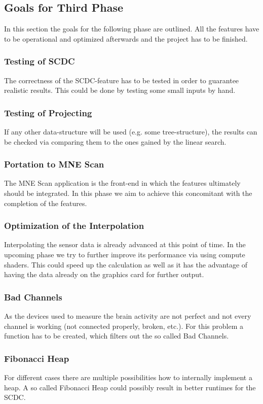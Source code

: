 \subsection{Goals for Third Phase}
In this section the goals for the following phase are outlined. All the features have to be operational and optimized afterwards and the project has to be finished.

\subsubsection{Testing of SCDC}
The correctness of the SCDC-feature has to be tested in order to guarantee realistic results. This could be done by testing some small inputs by hand.
\subsubsection{Testing of Projecting}
If any other data-structure will be used (e.g. some tree-structure), the results can be checked via comparing them to the ones gained by the linear search.
\subsubsection{Portation to MNE Scan}
The MNE Scan application is the front-end in which the features ultimately should be integrated. In this phase we aim to achieve this concomitant with the completion of the features.
\subsubsection{Optimization of the Interpolation}
Interpolating the sensor data is already advanced at this point of time. In the upcoming phase we try to further improve its performance via using compute shaders. This could speed up the calculation as well as it has the advantage of having the data already on the graphics card for further output.
\subsubsection{Bad Channels}
As the devices used to measure the brain activity are not perfect and not every channel is working  (not connected properly, broken, etc.). For this problem a function has to be created, which filters out the so called Bad Channels.
\subsubsection{Fibonacci Heap}
For different cases there are multiple possibilities how to internally implement a heap. A so called Fibonacci Heap could possibly result in better runtimes for the SCDC.